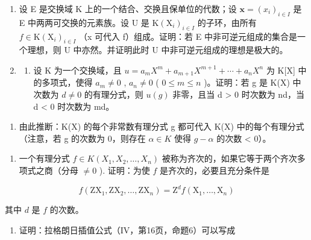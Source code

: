 \BourbakiExerciseGroup

\begin{enumerate}
\def\labelenumi{\arabic{enumi})}
\item
  设 E 是交换域 K 上的一个结合、交换且保单位的代数；设 \(\mathbf{x} = (x_i)_{i \in I}\) 是 E 中两两可交换的元素族。设 U 是 \(\mathrm{K}(\mathrm{X}_i)_{i \in I}\) 的子环，由所有 \(f \in \mathrm{K}(\mathrm{X}_i)_{i \in I}\) （x 可代入 f）组成。证明：若 E 中非可逆元组成的集合是一个理想，则 U 中亦然。并证明此时 U 中非可逆元组成的理想是极大的。
\item
  \begin{enumerate}
  \def\labelenumii{\alph{enumii})}
  \tightlist
  \item
    设 K 为一个交换域，且 \(u = a_{m}X^{m} + a_{m+1}X^{m+1} + \cdots + a_{n}X^{n}\) 为 K{[}X{]} 中的多项式，使得 \(a_{m} \neq 0\) , \(a_{n} \neq 0\) ( \(0 \leq m \leq n\) )。证明：若 g 是 K(X) 中次数为 \(d \neq 0\) 的有理分式，则 \(u(g)\) 非零，且当 d \textgreater{} 0 时次数为 nd，当 d \textless{} 0 时次数为 md。
  \end{enumerate}
\end{enumerate}

\begin{enumerate}
\def\labelenumi{\alph{enumi})}
\setcounter{enumi}{1}
\tightlist
\item
  由此推断：K(X) 的每个非常数有理分式 g 都可代入 K(X) 中的每个有理分式（注意，若 g 的次数为 0，则存在 \(\alpha \in K\) 使得 \(g - \alpha\) 的次数 \textless{} 0）。
\end{enumerate}

\begin{enumerate}
\def\labelenumi{\arabic{enumi})}
\setcounter{enumi}{2}
\tightlist
\item
  一个有理分式 \(f \in K(X_1, X_2, \ldots, X_n)\) 被称为齐次的，如果它等于两个齐次多项式之商（分母 \(\neq 0\) ). 证明：为使 \(f\) 是齐次的，必要且充分条件是
\end{enumerate}

\[
f \left(\mathrm{ZX} _ {1}, \mathrm{ZX} _ {2}, \dots , \mathrm{ZX} _ {n}\right) = \mathrm{Z} ^ {d} f \left(\mathrm{X} _ {1}, \dots , \mathrm{X} _ {n}\right)
\]

其中 \(d\) 是 \(f\) 的次数。

\begin{enumerate}
\def\labelenumi{\arabic{enumi})}
\setcounter{enumi}{3}
\tightlist
\item
  证明：拉格朗日插值公式（IV，第16页，命题6）可以写成
\end{enumerate}

